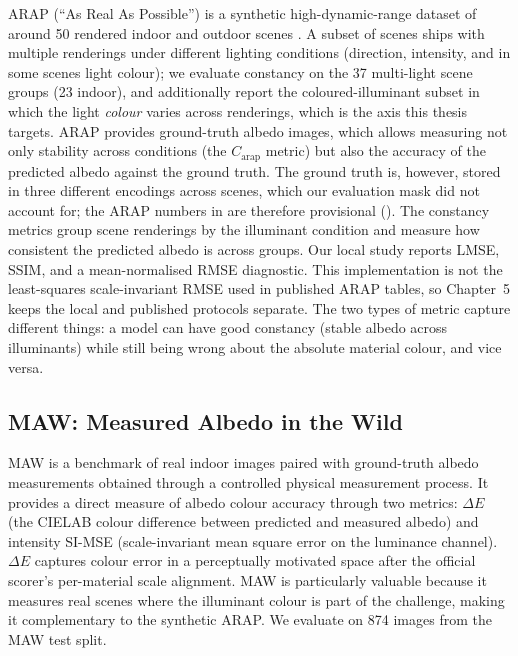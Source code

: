 ARAP (``As Real As Possible'') is a synthetic high-dynamic-range dataset of
around 50 rendered indoor and outdoor scenes .
A subset of scenes ships with multiple renderings under different lighting
conditions (direction, intensity, and in some scenes light colour); we evaluate
constancy on the 37 multi-light scene groups (23 indoor), and additionally
report the coloured-illuminant subset in which the light \emph{colour} varies
across renderings, which is the axis this thesis targets.
ARAP provides ground-truth albedo images, which allows measuring not only stability
across conditions (the $C_{\text{arap}}$ metric) but also the accuracy of the predicted
albedo against the ground truth. The ground truth is, however, stored in three different
encodings across scenes, which our evaluation mask did not account for; the ARAP numbers
in  are therefore provisional ().
The constancy metrics group scene renderings by the illuminant condition and
measure how consistent the predicted albedo is across groups.
Our local study reports LMSE, SSIM, and a mean-normalised RMSE diagnostic. This
implementation is not the least-squares scale-invariant RMSE used in published
ARAP tables, so Chapter~5 keeps the local and published protocols separate.
The two types of metric capture different things: a model can have good constancy
(stable albedo across illuminants) while still being wrong about the absolute
material colour, and vice versa.

\subsection{MAW: Measured Albedo in the Wild}
\label{sec:maw_dataset}

MAW  is a benchmark of real indoor images paired with ground-truth
albedo measurements obtained through a controlled physical measurement process.
It provides a direct measure of albedo colour accuracy through two metrics:
$\Delta E$ (the CIELAB colour difference between predicted and measured albedo)
and intensity SI-MSE (scale-invariant mean square error on the luminance channel).
$\Delta E$ captures colour error in a perceptually motivated space after the
official scorer's per-material scale alignment.
MAW is particularly valuable because it measures real scenes where the illuminant
colour is part of the challenge, making it complementary to the synthetic ARAP.
We evaluate on 874 images from the MAW test split.
